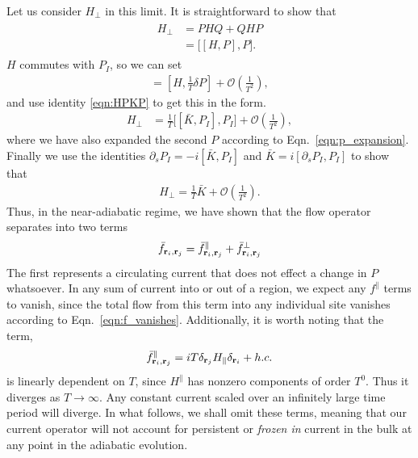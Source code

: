 Let us consider $H_\perp$ in this limit. It is straightforward to show that
\begin{align}
\begin{aligned}
    H_{\perp} &= PHQ+QHP \\ 
    &= \big[ [H,P] , P  \big].
\end{aligned}
\end{align}
$H$ commutes with $P_I$, so we can set  
\begin{align}
    [H,P] =[H, \frac{1}{T} \delta P]+ 
    \mathcal{O} \left (\frac{1}{T^2} \right ),
\end{align}
and use identity \ref{eqn:HPKP} to get this in the form.
\begin{align}
    H_{\perp} &= \frac{1}{T}  \big[ [\bar K, P_I] , P_I  \big] + 
    \mathcal{O} \left (\frac{1}{T^2} \right ), 
\end{align}
where we have also expanded the second $P$ according to Eqn.~\ref{eqn:p_expansion}. Finally we use the identities $\partial_s P_I = -i [\bar K, P_I]$ and $\bar  K = i[\partial_s P_I, P_I]$ to show that
\begin{align}
    H_{\perp} = \frac{1}{T} \bar K + \mathcal{O} \left (\frac{1}{T^2} \right ).
\end{align}
Thus, in the near-adiabatic regime, we have shown that the flow operator separates into two terms
\begin{align}
    \bar f_{\textbf r_i,\textbf r_j} = \bar f^\parallel_{\textbf r_i,\textbf r_j} + \bar f^\perp_{\textbf r_i,\textbf r_j}
\end{align}
The first represents a circulating current that does not effect a change in $P$ whatsoever. In any sum of current into or out of a region, we expect any $f^\parallel$ terms to vanish, since the total flow from this term into any individual site vanishes according to Eqn.~\ref{eqn:f_vanishes}. Additionally, it is worth noting that the term,
\begin{align}
    \bar f^\parallel _{\textbf r_i, \textbf r_j} = iT \delta_{\textbf r_j}H_\parallel \delta_{\textbf r_i } + h.c.
\end{align}
is linearly dependent on $T$, since $H^\parallel$ has nonzero components of order $T^0$. Thus it diverges as $T \rightarrow \infty$. Any constant current scaled over an infinitely large time period will diverge. In what follows, we shall omit these terms, meaning that our current operator will not account for persistent or \textit{frozen in} current in the bulk at any point in the adiabatic evolution.

